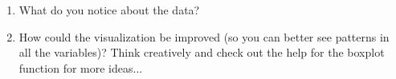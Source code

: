 \documentclass[12pt]{article}\usepackage[]{graphicx}\usepackage[]{color}
\newenvironment{knitrout}{}{} %
\begin{document}
\begin{enumerate}
\begin{knitrout}
\end{knitrout}
\begin{enumerate}
\item What do you notice about the data?
\item How could the visualization be improved (so you can better see patterns in all the variables)? Think creatively and check out the help for the boxplot function for more ideas...
\end{enumerate}

\end{enumerate}%


 
\end{document}
